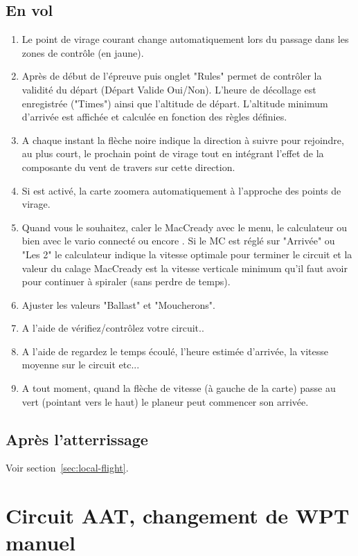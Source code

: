 \subsection*{En vol}
\begin{enumerate}
\item  Le point de virage courant change automatiquement lors du passage dans les zones de contrôle (en jaune).
\item  Après de début de l'épreuve  \blink{}puis onglet "Rules" permet de contrôler la validité du départ (Départ Valide Oui/Non). L'heure de décollage est enregistrée ("Times") ainsi que l'altitude de départ. L'altitude minimum d'arrivée est affichée et calculée en fonction des règles définies.
\item  A chaque instant la flèche noire indique la direction à suivre pour rejoindre, au plus court,  le prochain point de virage tout en intégrant l'effet de la composante du vent de travers sur cette direction.
\item  Si  est activé, la carte zoomera automatiquement à l'approche des points de virage.
\item Quand vous le souhaitez, caler le MacCready avec le menu, le calculateur ou bien avec le vario connecté ou encore  . Si le MC est réglé sur "Arrivée" ou "Les 2" le calculateur indique la vitesse optimale pour terminer le circuit et la valeur du calage MacCready est la vitesse verticale minimum qu'il faut avoir pour continuer à spiraler (sans perdre de temps).
\item  Ajuster les valeurs "Ballast" et "Moucherons".
\item  A l'aide de  vérifiez/contrôlez votre circuit..
\item  A l'aide de  regardez le temps écoulé, l'heure estimée d'arrivée, la vitesse moyenne sur le circuit etc...
\item  A tout moment, quand la flèche de vitesse (à gauche de la carte) passe au vert (pointant vers le haut) le planeur peut commencer son arrivée.
\end{enumerate}

\subsection*{Après l'atterrissage}
Voir section~\ref{sec:local-flight}.


\section{Circuit AAT, changement de WPT manuel}\label{sec:aat-task-manual}

